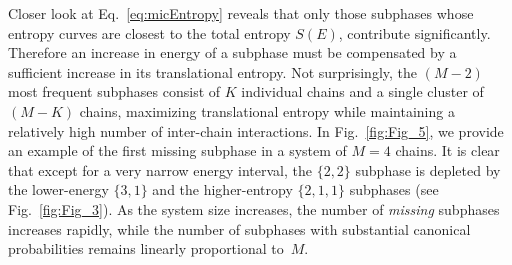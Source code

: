\documentclass[12pt]{report}
\begin{document}
Closer look at Eq.~\eqref{eq:micEntropy} 
reveals that only those subphases whose entropy curves 
are closest to the total entropy $S(E)$, contribute significantly. 
Therefore an increase in energy of a subphase must be 
compensated by a sufficient increase in its translational entropy.
Not surprisingly, the $(M-2)$ most frequent subphases 
consist of $K$ individual chains and a single cluster of $(M - K)$ chains,
maximizing translational entropy while maintaining a relatively high number
of 
inter-chain interactions. In Fig.~\ref{fig:Fig_5}, we provide an example
of the first missing subphase in a system of $M=4$ chains. 
It is clear that except for a very narrow energy interval,
the $\{2,2\}$ subphase is depleted by the lower-energy $\{3,1\}$ 
and the higher-entropy $\{2,1,1\}$ subphases (see Fig.~\ref{fig:Fig_3}). As
the system size
increases, the number of \textit{missing} subphases increases
rapidly, while the number of subphases with substantial canonical 
probabilities remains linearly proportional to~$M$. 
%
\end{document}
